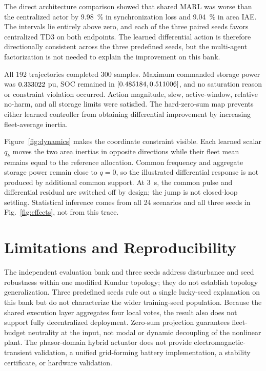 \documentclass[conference,a4paper]{IEEEtran}
\begin{document}
The direct architecture comparison showed that shared MARL was worse
than the centralized actor by \SI{9.98}{\percent} in synchronization loss and
\SI{9.04}{\percent} in area IAE. The intervals lie entirely above zero, and
each of the three paired seeds favors centralized TD3 on both endpoints. The
learned differential action is therefore directionally consistent across the
three predefined seeds, but the multi-agent factorization is not needed to
explain the improvement on this bank.

All 192 trajectories completed 300 samples. Maximum commanded storage power was
\(0.333022\) pu, SOC remained in
\([0.485184,0.511006]\), and no saturation reason or constraint
violation occurred. Action magnitude, slew, active-window, relative no-harm,
and all storage limits were satisfied. The hard-zero-sum map prevents either
learned controller from obtaining differential improvement by increasing
fleet-average inertia.

Figure~\ref{fig:dynamics} makes the coordinate constraint visible. Each learned
scalar \(q_k\) moves the two area inertias in opposite directions while their
fleet mean remains equal to the reference allocation. Common frequency and
aggregate storage power remain close to \(q=0\), so the illustrated
differential response is not produced by additional common support. At
\SI{3}{s}, the common pulse and differential residual are switched off by
design; the jump is not closed-loop settling. Statistical inference comes from
all 24 scenarios and all three seeds in Fig.~\ref{fig:effects}, not from this
trace.

\FloatBarrier
\section{Limitations and Reproducibility}

The independent evaluation bank and three seeds address disturbance and seed
robustness within one modified Kundur topology; they do not establish topology
generalization. Three predefined seeds rule out a single lucky-seed explanation
on this bank but do not characterize the wider training-seed population.
Because the shared execution layer aggregates four local votes,
the result also does not support fully decentralized deployment. Zero-sum
projection guarantees fleet-budget neutrality at the input, not modal or
dynamic decoupling of the nonlinear plant. The phasor-domain hybrid actuator
does not provide electromagnetic-transient validation, a unified grid-forming
battery implementation, a stability certificate, or hardware validation.
\end{document}

